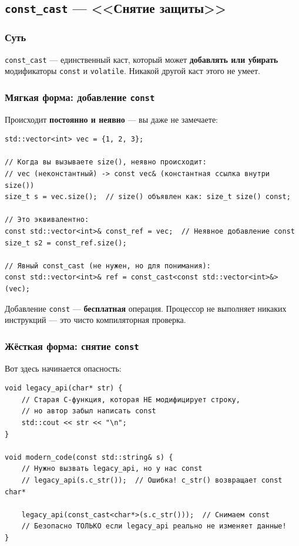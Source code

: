 \documentclass[a4paper,12pt]{article}
\begin{document}
\subsection{\texttt{const\_cast} --- <<Снятие защиты>>}

\subsubsection{Суть}

\texttt{const\_cast} --- единственный каст, который может \textbf{добавлять или
убирать} модификаторы \texttt{const} и \texttt{volatile}. Никакой другой каст
этого не умеет.

\subsubsection{Мягкая форма: добавление \texttt{const}}

Происходит \textbf{постоянно и неявно} --- вы даже не замечаете:

\begin{lstlisting}
std::vector<int> vec = {1, 2, 3};

// Когда вы вызываете size(), неявно происходит:
// vec (неконстантный) -> const vec& (константная ссылка внутри size())
size_t s = vec.size();  // size() объявлен как: size_t size() const;

// Это эквивалентно:
const std::vector<int>& const_ref = vec;  // Неявное добавление const
size_t s2 = const_ref.size();

// Явный const_cast (не нужен, но для понимания):
const std::vector<int>& ref = const_cast<const std::vector<int>&>(vec);
\end{lstlisting}

Добавление \texttt{const} --- \textbf{бесплатная} операция. Процессор не выполняет
никаких инструкций --- это чисто компиляторная проверка.

\subsubsection{Жёсткая форма: снятие \texttt{const}}

Вот здесь начинается опасность:

\begin{lstlisting}
void legacy_api(char* str) {
    // Старая C-функция, которая НЕ модифицирует строку,
    // но автор забыл написать const
    std::cout << str << "\n";
}

void modern_code(const std::string& s) {
    // Нужно вызвать legacy_api, но у нас const
    // legacy_api(s.c_str());  // Ошибка! c_str() возвращает const char*

    legacy_api(const_cast<char*>(s.c_str()));  // Снимаем const
    // Безопасно ТОЛЬКО если legacy_api реально не изменяет данные!
}
\end{lstlisting}
\end{document}
